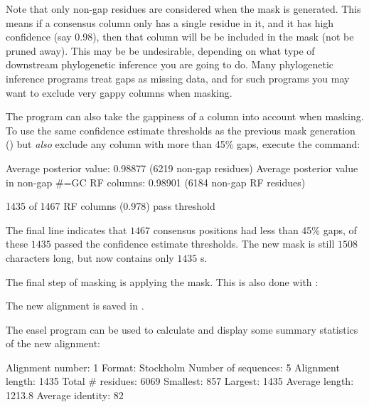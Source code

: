Note that only non-gap residues are considered when the mask is
generated. This means if a consensus column only has a single residue
in it, and it has high confidence (say 0.98), then that column will be
be included in the mask (not be pruned away). This may be be
undesirable, depending on what type of downstream phylogenetic inference
you are going to do. Many phylogenetic inference programs treat gaps
as missing data, and for such programs you may want to exclude very gappy
columns when masking. 

The  program can also take the gappiness of a
column into account when masking. To use the same confidence estimate
thresholds as the previous  mask generation
() but \emph{also} exclude any column 
with more than 45\% gaps, execute the command:


\begin{sreoutput}
Average posterior value:                            0.98877 (6219 non-gap residues)
Average posterior value in non-gap #=GC RF columns: 0.98901 (6184 non-gap RF residues)

1435 of 1467 RF columns (0.978) pass threshold
\end{sreoutput}

The final line indicates that $1467$ consensus positions had less
than 45\% gaps, of these $1435$ passed the confidence estimate
thresholds. The new mask  is still $1508$ characters
long, but now contains only $1435$ s.

The final step of masking is applying the mask. This is also done with
:


The new alignment is saved in .

The easel program  can be used to calculate and
display some summary statistics of the new alignment:


\begin{sreoutput}
Alignment number:    1
Format:              Stockholm
Number of sequences: 5
Alignment length:    1435
Total # residues:    6069
Smallest:            857
Largest:             1435
Average length:      1213.8
Average identity:    82%
\end{sreoutput}

